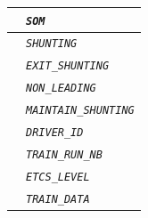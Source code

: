 \documentclass{template/openetcs}
\begin{document}
\begin{itemize}
\begin{longtable}{|l|l|}
				&	\begin{minipage}[t]{0.78\linewidth} \emph{\texttt{SOM}} \end{minipage} \\
				
				\hline
				
				&	\begin{minipage}[t]{0.78\linewidth} \emph{\texttt{SHUNTING}} \end{minipage} \\
				
				\hline
				
				&	\begin{minipage}[t]{0.78\linewidth} \emph{\texttt{EXIT\_SHUNTING}} \end{minipage} \\
				
				\hline
				
				&	\begin{minipage}[t]{0.78\linewidth} \emph{\texttt{NON\_LEADING}} \end{minipage} \\
				
				\hline
				
				&	\begin{minipage}[t]{0.78\linewidth} \emph{\texttt{MAINTAIN\_SHUNTING}} \end{minipage} \\
				
				\hline
				
				&	\begin{minipage}[t]{0.78\linewidth} \emph{\texttt{DRIVER\_ID}} \end{minipage} \\
				
				\hline
				
				&	\begin{minipage}[t]{0.78\linewidth} \emph{\texttt{TRAIN\_RUN\_NB}} \end{minipage} \\
				
				\hline
				
				&	\begin{minipage}[t]{0.78\linewidth} \emph{\texttt{ETCS\_LEVEL}} \end{minipage} \\
				
				\hline
				
				&	\begin{minipage}[t]{0.78\linewidth} \emph{\texttt{TRAIN\_DATA}} \end{minipage} \\
				

\end{longtable}
\end{itemize}
\end{document}
